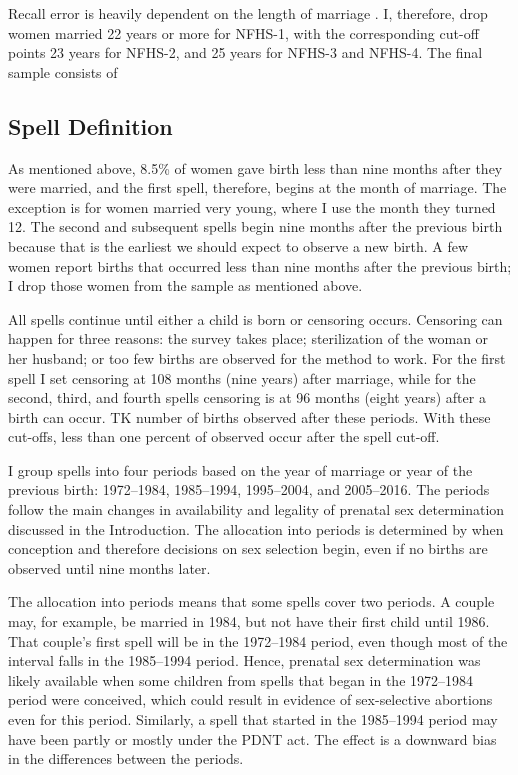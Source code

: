 \documentclass[12pt,letterpaper]{article}
\begin{document}
Recall error is heavily dependent on the length of marriage \citep{Portner2018b}.
I, therefore, drop women married 22 years or more 
for NFHS-1, with the corresponding cut-off points 23 years for NFHS-2, 
and 25 years for NFHS-3 and NFHS-4.
The final sample consists of 



\subsection{Spell Definition\label{sec:spell_def}}

As mentioned above, 8.5\% of women gave birth less than nine months
after they were married, and the first spell, therefore, begins at the 
month of marriage.
The exception is for women married very young, where I use the month they 
turned 12.
The second and subsequent spells begin nine months after the previous birth 
because that is the earliest we should expect to observe a new birth.
A few women report births that occurred less than nine months 
after the previous birth; I drop those women from the sample as mentioned above.

All spells continue until either a child is born or censoring occurs.
Censoring can happen for three reasons:
the survey takes place;
sterilization of the woman or her husband;
or too few births are observed for the method to work.
For the first spell I set censoring at 108 months (nine years) after marriage,
while for the second, third, and fourth spells censoring is at 96 months 
(eight years) after a birth can occur.
TK number of births observed after these periods.
With these cut-offs, less than one percent of observed occur after
the spell cut-off.

I group spells into four periods based on the year of marriage
or year of the previous birth:
1972--1984, 1985--1994, 1995--2004, and 2005--2016.
The periods follow the main changes in availability and legality of 
prenatal sex determination discussed in the Introduction.
The allocation into periods is determined by when conception and therefore 
decisions on sex selection begin, even if no births are observed until 
nine months later.

The allocation into periods means that some spells cover two periods.
A couple may, for example, be married in 1984, but not have their first 
child until 1986.
That couple's first spell will be in the 1972--1984 period, even though 
most of the interval falls in the 1985--1994 period.
Hence, prenatal sex determination was likely available when some
children from spells that began in the 1972--1984 period were conceived,
which could result in evidence of sex-selective abortions even for this
period.
Similarly, a spell that started in the 1985--1994 period may have been partly 
or mostly under the PDNT act.
The effect is a downward bias in the differences between the periods.
\end{document}
